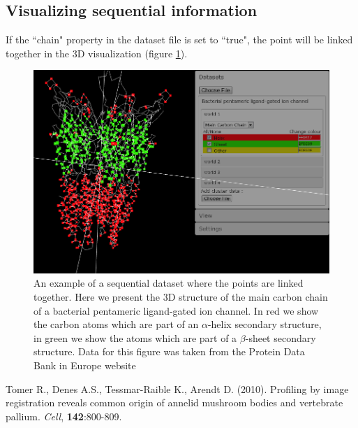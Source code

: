 \documentclass{bioinfo}
\begin{document}
\subsection{Visualizing sequential information}
If the ``chain" property in the dataset file is set to ``true", the point will be linked together in the 3D visualization (figure \ref{fig:02}).
\begin{figure}[h!]%
\centerline{\includegraphics[totalheight=0.2\textheight]{Supp_fig2.png}}
\caption{An example of a sequential dataset where the points are linked together. Here we present the 3D structure of the main carbon chain of a bacterial pentameric ligand-gated ion channel. In red we show the carbon atoms which are part of an $\alpha$-helix secondary structure, in green we show the atoms which are part of a $\beta$-sheet secondary structure. Data for this figure was taken from the Protein Data Bank in Europe website}\label{fig:02}
\end{figure}
\begin{thebibliography}{}
 Tomer R., Denes A.S., Tessmar-Raible K., Arendt D. (2010). Profiling by image registration reveals common origin of annelid mushroom bodies and vertebrate pallium. {\it{Cell}}, {\bf{142}}:800-809. 
\end{thebibliography}
\end{document}
